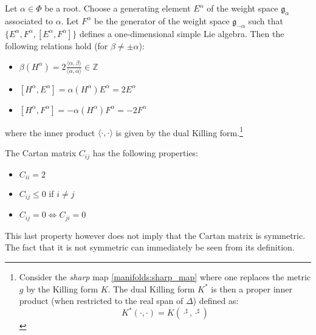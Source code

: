         \begin{property}
        	Let $\alpha\in\Phi$ be a root. Choose a generating element $E^\alpha$ of the weight space $\mathfrak{g}_\alpha$ associated to $\alpha$. Let $F^\alpha$ be the generator of the weight space $\mathfrak{g}_{-\alpha}$ such that $\{E^\alpha, F^\alpha, [E^\alpha, F^\alpha]\}$ defines a one-dimensional simple Lie algebra. Then the following relations hold (for $\beta\neq\pm\alpha$):
        	\begin{itemize}
        		\item $\beta(H^\alpha) = 2\frac{\langle\alpha, \beta\rangle}{\langle\alpha, \alpha\rangle}\in\mathbb{Z}$
        		\item $[H^\alpha, E^\alpha] = \alpha(H^\alpha)E^\alpha = 2E^\alpha$
        		\item $[H^\alpha, F^\alpha] = -\alpha(H^\alpha)F^\alpha = -2F^\alpha$
        	\end{itemize}
        	where the inner product $\langle\cdot,\cdot\rangle$ is given by the dual Killing form.\footnote{Consider the \textit{sharp} map \ref{manifolds:sharp_map} where one replaces the metric $g$ by the Killing form $K$. The dual Killing form $K^*$ is then a proper inner product (when restricted to the real span of $\Delta$) defined as: \[K^*(\cdot, \cdot) = K(\cdot^\sharp, \cdot^\sharp)\]}
        \end{property}

        \begin{property}\label{lie:cartan_prop}
        	The Cartan matrix $C_{ij}$ has the following properties:
        	\begin{itemize}
        		\item $C_{ii} = 2$
        		\item $C_{ij} \leq 0$ if $i\neq j$
        		\item $C_{ij} = 0\iff C_{ji} = 0$
        	\end{itemize}
        	This last property however does not imply that the Cartan matrix is symmetric. The fact that it is not symmetric can immediately be seen from its definition.
        \end{property}
        
